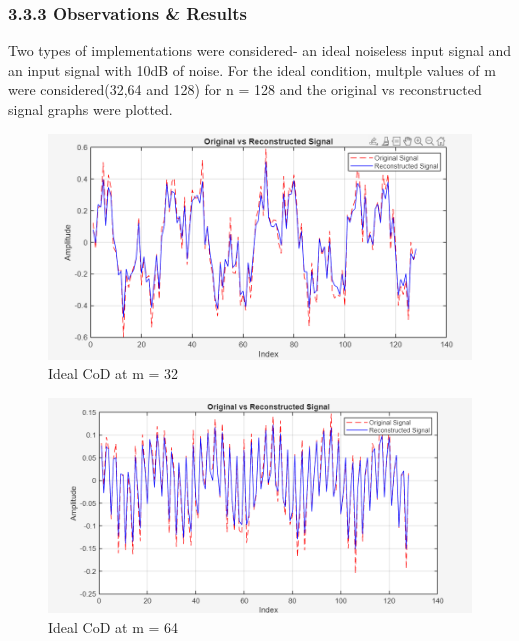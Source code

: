 \documentclass[
  letterpaper,
  DIV=11,
  numbers=noendperiod]{scrartcl}
\begin{document}
\subsubsection{3.3.3 Observations \&
Results}\label{observations-results-2}

Two types of implementations were considered- an ideal noiseless input
signal and an input signal with 10dB of noise. For the ideal condition,
multple values of m were considered(32,64 and 128) for n = 128 and the
original vs reconstructed signal graphs were plotted.

\begin{figure}[H]

{\centering \includegraphics[width=0.8\linewidth,height=\textheight,keepaspectratio]{abar-cs_files/mediabag/cod_m32.png}

}

\caption{Ideal CoD at m = 32}

\end{figure}%

\begin{figure}[H]

{\centering \includegraphics[width=0.8\linewidth,height=\textheight,keepaspectratio]{abar-cs_files/mediabag/cod_m64.png}

}

\caption{Ideal CoD at m = 64}

\end{figure}%
\end{document}

